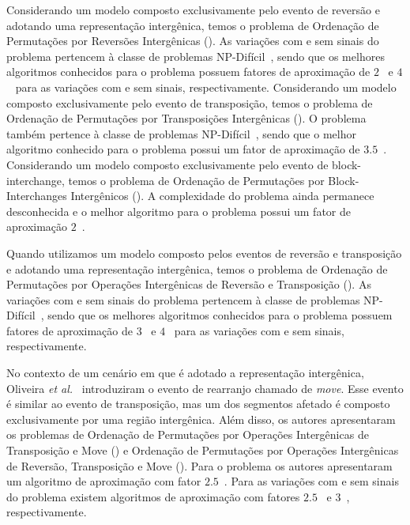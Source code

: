 Considerando um modelo composto exclusivamente pelo evento de reversão e adotando uma representação intergênica, temos o problema de Ordenação de Permutações por Reversões Intergênicas (\SbIR). As variações com e sem sinais do problema pertencem à classe de problemas NP-Difícil~\cite{2021b-oliveira-etal,2020a-brito-etal}, sendo que os melhores algoritmos conhecidos para o problema possuem fatores de aproximação de $2$~\cite{2021b-oliveira-etal} e $4$~\cite{2020a-brito-etal} para as variações com e sem sinais, respectivamente. Considerando um modelo composto exclusivamente pelo evento de transposição, temos o problema de Ordenação de Permutações por Transposições Intergênicas (\SbIT). O problema também pertence à classe de problemas NP-Difícil~\cite{2021a-oliveira-etal}, sendo que o melhor algoritmo conhecido para o problema possui um fator de aproximação de $3.5$~\cite{2021a-oliveira-etal}. Considerando um modelo composto exclusivamente pelo evento de block-interchange, temos o problema de Ordenação de Permutações por Block-Interchanges Intergênicos (\SbIBI). A complexidade do problema ainda permanece desconhecida e o melhor algoritmo para o problema possui um fator de aproximação $2$~\cite{2019-dias-etal}.

Quando utilizamos um modelo composto pelos eventos de reversão e transposição e adotando uma representação intergênica, temos o problema de Ordenação de Permutações por Operações Intergênicas de Reversão e Transposição (\SbIRT). As variações com e sem sinais do problema pertencem à classe de problemas NP-Difícil~\cite{2021a-oliveira-etal,2020a-brito-etal}, sendo que os melhores algoritmos conhecidos para o problema possuem fatores de aproximação de $3$~\cite{2021a-oliveira-etal} e $4$~\cite{2021b-brito-etal} para as variações com e sem sinais, respectivamente.

No contexto de um cenário em que é adotado a representação intergênica, Oliveira \textit{et al.}~\cite{2021a-oliveira-etal} introduziram o evento de rearranjo chamado de \emph{move}. Esse evento é similar ao evento de transposição, mas um dos segmentos afetado é composto exclusivamente por uma região intergênica. Além disso, os autores apresentaram os problemas de Ordenação de Permutações por Operações Intergênicas de Transposição e Move (\SbITM) e Ordenação de Permutações por Operações Intergênicas de Reversão, Transposição e Move (\SbIRTM). Para o problema \SbITM{} os autores apresentaram um algoritmo de aproximação com fator $2.5$~\cite{2021a-oliveira-etal}. Para as variações com e sem sinais do problema \SbIRTM{} existem algoritmos de aproximação com fatores $2.5$~\cite{2021a-oliveira-etal} e $3$~\cite{2021b-brito-etal}, respectivamente.  

